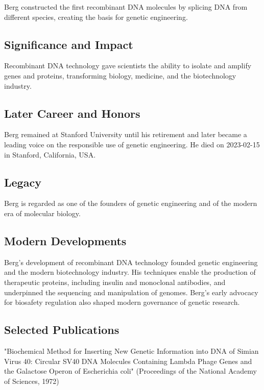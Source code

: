 Berg constructed the first recombinant DNA molecules by splicing DNA from different species, creating the basis for genetic engineering.

\subsection*{Significance and Impact}

Recombinant DNA technology gave scientists the ability to isolate and amplify genes and proteins, transforming biology, medicine, and the biotechnology industry.

\subsection*{Later Career and Honors}

Berg remained at Stanford University until his retirement and later became a leading voice on the responsible use of genetic engineering. He died on 2023-02-15 in Stanford, California, USA.

\subsection*{Legacy}

Berg is regarded as one of the founders of genetic engineering and of the modern era of molecular biology.

\subsection*{Modern Developments}

Berg's development of recombinant DNA technology founded genetic engineering and the modern biotechnology industry. His techniques enable the production of therapeutic proteins, including insulin and monoclonal antibodies, and underpinned the sequencing and manipulation of genomes. Berg's early advocacy for biosafety regulation also shaped modern governance of genetic research.

\subsection*{Selected Publications}

"Biochemical Method for Inserting New Genetic Information into DNA of Simian Virus 40: Circular SV40 DNA Molecules Containing Lambda Phage Genes and the Galactose Operon of Escherichia coli" (Proceedings of the National Academy of Sciences, 1972)

